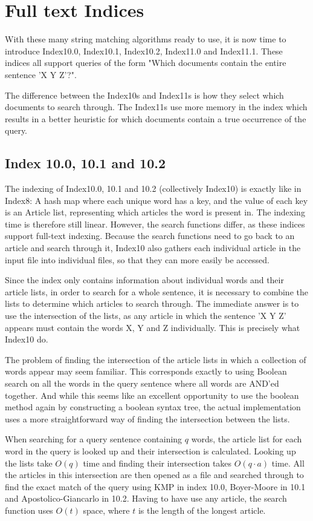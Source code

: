 \section{Full text Indices}\label{sec:index10}

With these many string matching algorithms ready to use, it is now time to introduce Index10.0, Index10.1, Index10.2, Index11.0 and Index11.1. These indices all support queries of the form "Which documents contain the entire sentence 'X Y Z'?". 

The difference between the Index10s and Index11s is how they select which documents to search through. The Index11s use more memory in the index which results in a better heuristic for which documents contain a true occurrence of the query. 

\subsection{Index 10.0, 10.1 and 10.2}
The indexing of Index10.0, 10.1 and 10.2 (collectively Index10) is exactly like in Index8: A hash map where each unique word has a key, and the value of each key is an Article list, representing which articles the word is present in. The indexing time is therefore still linear. However, the search functions differ, as these indices support full-text indexing. Because the search functions need to go back to an article and search through it, Index10 also gathers each individual article in the input file into individual files, so that they can more easily be accessed. 

Since the index only contains information about individual words and their article lists, in order to search for a whole sentence, it is necessary to combine the lists to determine which articles to search through. The immediate answer is to use the intersection of the lists, as any article in which the sentence 'X Y Z' appears must contain the words X, Y and Z individually. This is precisely what Index10 do. 

The problem of finding the intersection of the article lists in which a collection of words appear may seem familiar. This corresponds exactly to using Boolean search on all the words in the query sentence where all words are AND'ed together. And while this seems like an excellent opportunity to use the boolean method again by constructing a boolean syntax tree, the actual implementation uses a more straightforward way of finding the intersection between the lists. 

When searching for a query sentence containing $q$ words, the article list for each word in the query is looked up and their intersection is calculated. Looking up the lists take $O(q)$ time and finding their intersection takes $O(q\cdot a)$ time. All the articles in this intersection are then opened as a file and searched through to find the exact match of the query using KMP in index 10.0, Boyer-Moore in 10.1 and Apostolico-Giancarlo in 10.2. Having to have use any article, the search function uses $O(t)$ space, where $t$ is the length of the longest article. 

